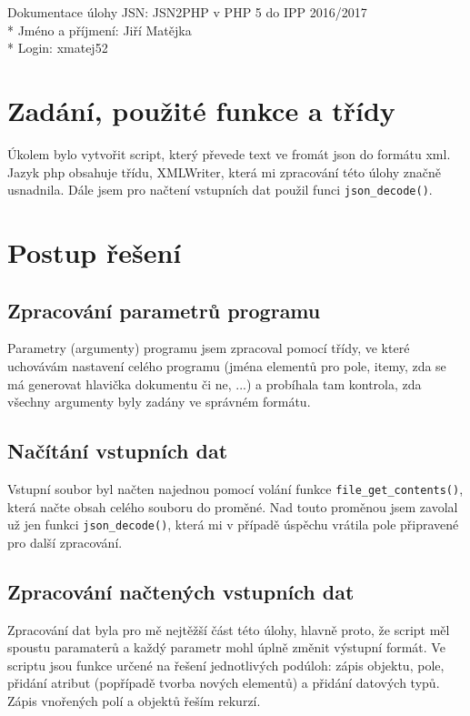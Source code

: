 \documentclass[a4paper, 10pt]{article}
\begin{document}
    \noindent
    Dokumentace úlohy JSN: JSN2PHP v PHP 5 do IPP 2016/2017 \\*
    Jméno a příjmení: Jiří Matějka \\*
    Login: xmatej52

    \section{Zadání, použité funkce a třídy}
        Úkolem bylo vytvořit script, který převede text ve fromát json do formátu
        xml. Jazyk php obsahuje třídu, XMLWriter, která mi zpracování této úlohy
        značně usnadnila. Dále jsem pro načtení vstupních dat použil funci
        \texttt{json\_decode()}.
    \section{Postup řešení}
        \subsection{Zpracování parametrů programu}
            Parametry (argumenty) programu jsem zpracoval pomocí třídy, ve které
            uchovávám nastavení celého programu (jména elementů pro pole,
            itemy, zda se má generovat hlavička dokumentu či ne, ...) a probíhala
            tam kontrola, zda všechny argumenty byly zadány ve správném formátu.
        \subsection{Načítání vstupních dat}
            Vstupní soubor byl načten najednou pomocí volání funkce \texttt{file\_get\_contents()},
            která načte obsah celého souboru do proměné. Nad touto proměnou jsem
            zavolal už jen funkci \texttt{json\_decode()}, která mi v případě úspěchu vrátila
            pole připravené pro další zpracování.
        \subsection{Zpracování načtených vstupních dat}
            Zpracování dat byla pro mě nejtěžší část této úlohy, hlavně proto, že
            script měl spoustu paramaterů a každý parametr mohl úplně změnit
            výstupní formát. Ve scriptu jsou funkce určené na řešení jednotlivých
            podúloh: zápis objektu, pole, přidání atribut (popřípadě tvorba nových
            elementů) a přidání datových typů. Zápis vnořených polí a objektů
            řeším rekurzí.
\end{document}
